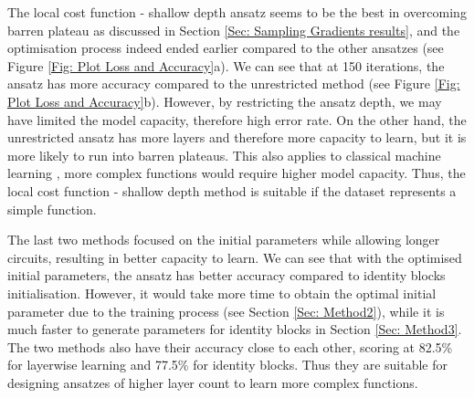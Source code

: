 The local cost function - shallow depth ansatz seems to be the best in overcoming barren plateau as discussed in Section \ref{Sec: Sampling Gradients results}, and the optimisation process indeed ended earlier compared to the other ansatzes (see Figure \ref{Fig: Plot Loss and Accuracy}a).
We can see that at 150 iterations, the ansatz has more accuracy compared to the unrestricted method (see Figure \ref{Fig: Plot Loss and Accuracy}b).
However, by restricting the ansatz depth, we may have limited the model capacity, therefore high error rate.
On the other hand, the unrestricted ansatz has more layers and therefore more capacity to learn, but it is more likely to run into barren plateaus.
This also applies to classical machine learning \cite{ianDeepLearningAdaptive2016}, more complex functions would require higher model capacity.
Thus, the local cost function - shallow depth method is suitable if the dataset represents a simple function.

The last two methods focused on the initial parameters while allowing longer circuits, resulting in better capacity to learn.
We can see that with the optimised initial parameters, the ansatz has better accuracy compared to identity blocks initialisation.
However, it would take more time to obtain the optimal initial parameter due to the training process (see Section \ref{Sec: Method2}), while it is much faster to generate parameters for identity blocks in Section \ref{Sec: Method3}.
The two methods also have their accuracy close to each other, scoring at 82.5\% for layerwise learning and 77.5\% for identity blocks.
Thus they are suitable for designing ansatzes of higher layer count to learn more complex functions.


% 


